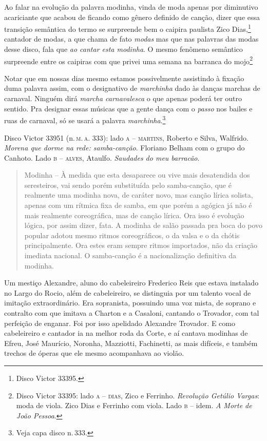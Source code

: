 Ao falar na evolução da palavra modinha, vinda de moda apenas por
diminutivo acariciante que acabou de ficando como gênero definido de
canção, dizer que essa transição semântica do termo se surpreende bem o
caipira paulista Zico Dias,\footnote{Disco Victor 33395.} cantador de modas, a
que chama de fato \textit{modas} mas que nas palavras das modas desse disco,
fala que \textit{ao cantar esta modinha}. O mesmo fenômeno semântico surpreende
entre os caipiras com que privei uma semana na barranca do mojo\footnote{Disco Victor 33395: lado \textsc{a} -- \textsc{dias}, Zico e Ferrinho. \textit{Revolução
Getúlio Vargas}: moda de viola. Zico Dias e Ferrinho com viola. Lado \textsc{b} --
idem. \textit{A Morte de João Pessoa}.}


Notar que em nossas dias mesmo estamos possivelmente assistindo à
fixação duma palavra assim, com o designativo de \textit{marchinha} dado às
danças marchas de carnaval. Ninguém dirá \textit{marcha carnavalesca} o que
apenas poderá ter outro sentido. Pra designar essas músicas que a gente
dança com o \textit{passo} nos bailes e ruas de carnaval, só se usará a palavra
\textit{marchinha}.\footnote{Veja capa disco n.\,333.} %

Disco Victor 33951 (n.\,\textsc{m.\,a.} 333): lado \textsc{a} -- \textsc{martins}, Roberto e Silva, Walfrido. \textit{Morena que dorme na rede: samba-canção}. Floriano Belham com o grupo do Canhoto. Lado \textsc{b} -- \textsc{alves}, Ataulfo. \textit{Saudades do meu barracão}. 

\begin{quote}
\small{
Modinha -- À medida que esta desaparece ou
vive mais desatendida dos seresteiros, vai sendo porém substituída pelo
samba-canção, que é realmente uma modinha nova, de caráter novo, mas
canção lírica solista, apenas com um rítmica fixa de samba, em que porém
a agógica já não é mais realmente coreográfica, mas de canção lírica.
Ora isso é evolução lógica, por assim dizer, fata. A modinha de salão
passada pra boca do povo popular adotou mesmo ritmos coreográficos, o da
valsa e o da chótis principalmente. Ora estes eram sempre ritmos
importados, não da criação imediata nacional. O samba-canção é a
nacionalização definitiva da modinha.}
\end{quote}

Um mestiço Alexandre, aluno do cabeleireiro Frederico Reis que estava
instalado no Largo do Rocio, além de cabeleireiro, se distinguia por um
talento vocal de imitação extraordinário. Era sopranista, possuindo uma
voz mista, de soprano e contralto com que imitava a Charton e a
Casaloni, cantando o Trovador, com tal perfeição de enganar. Foi por
isso apelidado Alexandre Trovador. E como cabeleireiro e cantador ia na
melhor roda da Corte, e aí cantava modinhas de Efreu, José Maurício,
Noronha, Mazziotti, Fachinetti, as mais difíceis, e também trechos de
óperas que ele mesmo acompanhava ao violão. %

